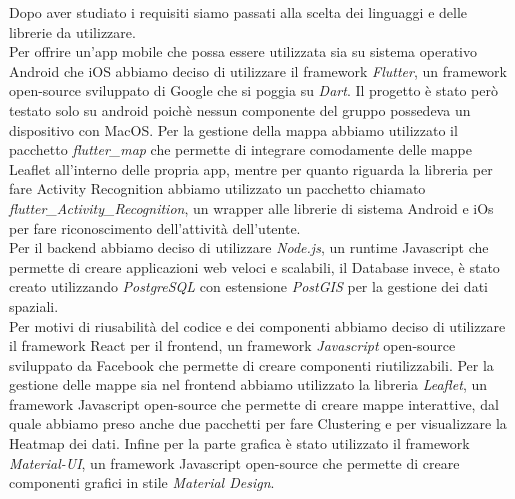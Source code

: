 \documentclass[../../Report.tex]{subfiles}
\begin{document}
    Dopo aver studiato i requisiti siamo passati alla scelta dei linguaggi e delle librerie da utilizzare.\\
    Per offrire un'app mobile che possa essere utilizzata sia su sistema operativo Android che iOS abbiamo deciso di utilizzare il framework \emph{Flutter}, un framework open-source sviluppato di Google che si poggia su \emph{Dart}. Il progetto è stato però testato solo su android poichè nessun componente del gruppo possedeva un dispositivo con MacOS. Per la gestione della mappa abbiamo utilizzato il pacchetto \emph{flutter\_map} che permette di integrare comodamente delle mappe Leaflet all'interno delle propria app, mentre per quanto riguarda la libreria per fare Activity Recognition abbiamo utilizzato un pacchetto chiamato \emph{flutter\_Activity\_Recognition}, un wrapper alle librerie di sistema Android e iOs per fare riconoscimento dell'attività dell'utente. \\
    Per il backend abbiamo deciso di utilizzare \emph{Node.js}, un runtime Javascript che permette di creare applicazioni web veloci e scalabili, il Database invece, è stato creato utilizzando \emph{PostgreSQL} con estensione \emph{PostGIS} per la gestione dei dati spaziali.\\
    Per  motivi di riusabilità del codice e dei componenti abbiamo deciso di utilizzare il framework React per il frontend, un framework \emph{Javascript} open-source sviluppato da Facebook che permette di creare componenti riutilizzabili. 
    Per la gestione delle mappe sia nel frontend abbiamo utilizzato la libreria \emph{Leaflet}, un framework Javascript open-source che permette di creare mappe interattive, dal quale abbiamo preso anche due pacchetti per fare Clustering e per visualizzare la Heatmap dei dati. Infine per la parte grafica è stato utilizzato il framework \emph{Material-UI}, un framework Javascript open-source che permette di creare componenti grafici in stile \emph{Material Design}.\\
    
\end{document}

